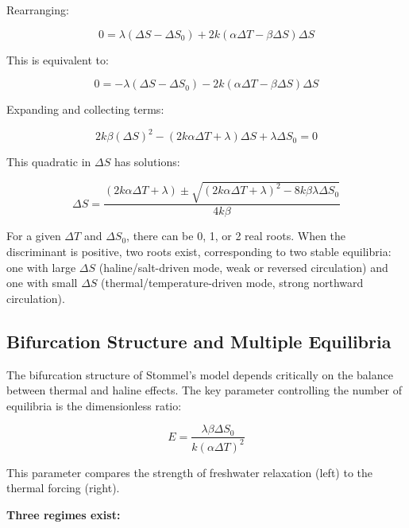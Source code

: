 \documentclass[12pt,letterpaper]{article}
\begin{document}
Rearranging:

\begin{equation}
0 = \lambda(\Delta S - \Delta S_0) + 2k(\alpha\Delta T - \beta\Delta S)\Delta S
\end{equation}

This is equivalent to:

\begin{equation}
0 = -\lambda(\Delta S - \Delta S_0) - 2k(\alpha\Delta T - \beta\Delta S)\Delta S
\end{equation}

Expanding and collecting terms:

\begin{equation}
2k\beta(\Delta S)^2 - (2k\alpha\Delta T + \lambda)\Delta S + \lambda\Delta S_0 = 0
\end{equation}

This quadratic in $\Delta S$ has solutions:

\begin{equation}
\Delta S = \frac{(2k\alpha\Delta T + \lambda) \pm \sqrt{(2k\alpha\Delta T + \lambda)^2 - 8k\beta\lambda\Delta S_0}}{4k\beta}
\end{equation}

For a given $\Delta T$ and $\Delta S_0$, there can be 0, 1, or 2 real roots. When the discriminant is positive, two roots exist, corresponding to two stable equilibria: one with large $\Delta S$ (haline/salt-driven mode, weak or reversed circulation) and one with small $\Delta S$ (thermal/temperature-driven mode, strong northward circulation).

\subsection{Bifurcation Structure and Multiple Equilibria}

The bifurcation structure of Stommel's model depends critically on the balance between thermal and haline effects. The key parameter controlling the number of equilibria is the dimensionless ratio:

\begin{equation}
E = \frac{\lambda\beta\Delta S_0}{k(\alpha\Delta T)^2}
\end{equation}

This parameter compares the strength of freshwater relaxation (left) to the thermal forcing (right).

\noindent \textbf{Three regimes exist:}
\end{document}
